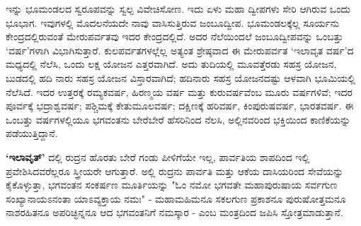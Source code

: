 ಇನ್ನು ಭೂಮಂಡಲದ ಸ್ವರೂಪವನ್ನು ಸ್ವಲ್ಪ ವಿವೇಚಿಸೋಣ. ಇದು ಏಳು ಮಹಾ ದ್ವೀಪಗಳು ಸೇರಿ ಆಗಿರುವ ಒಂದು ಭೂಭಾಗ. ಇವುಗಳಲ್ಲಿ ಮೊದಲನೆಯದೇ ನಾವು ವಾಸಿಸುತ್ತಿರುವ ಜಂಬೂದ್ವೀಪ. ಭೂಮಂಡಲಕ್ಕೆಲ್ಲ ಸೂರ್ಯನು ಕೇಂದ್ರದಲ್ಲಿರುವಂತೆ ಮೇರುಪರ್ವತವು ಇದರ ಕೇಂದ್ರದಲ್ಲಿದೆ. ಅದರ ನೆಲೆಯಿಂದಲೆ ಜಂಬೂದ್ವೀಪವನ್ನು ಒಂಬತ್ತು ‘ವರ್ಷ’ಗಳಾಗಿ ವಿಭಾಗಿಸುತ್ತಾರೆ. ಕುಲಪರ್ವತಗಳಲ್ಲೆಲ್ಲ ಅತ್ಯಂತ ಶ್ರೇಷ್ಠವಾದ ಈ ಮೇರುಪರ್ವತ ‘ಇಲಾವೃತ ವರ್ಷ’ದ ಮಧ್ಯದಲ್ಲಿ ನೆಲೆಸಿ, ಒಂದು ಲಕ್ಷ ಯೋಜನ ಎತ್ತರವಾಗಿದೆ. ಅದು ತುದಿಯಲ್ಲಿ ಮೂವತ್ತೆರಡು ಸಹಸ್ರ ಯೋಜನ, ಬುಡದಲ್ಲಿ ಹದಿ ನಾರು ಸಹಸ್ರ ಯೋಜನ ವಿಸ್ತಾರವಾಗಿದೆ; ಹದಿನಾರು ಸಹಸ್ರ ಯೋಜನದಷ್ಟು ಆಳವಾಗಿ ಭೂಮಿಯಲ್ಲಿ ನೆಲೆಸಿದೆ. ಇದರ ಉತ್ತರಕ್ಕೆ ರಮ್ಯಕವರ್ಷ, ಹಿರಣ್ಮಯ ವರ್ಷ ಮತ್ತು ಕುರುವರ್ಷವೆಂಬ ಮೂರು ವರ್ಷಗಳಿವೆ; ಇದರ ಪೂರ್ವಕ್ಕೆ ಭದ್ರಾಶ್ವವರ್ಷ; ಪಶ್ಚಿಮಕ್ಕೆ ಕೇತುಮೂಲವರ್ಷ; ದಕ್ಷಿಣಕ್ಕೆ ಹರಿವರ್ಷ, ಕಿಂಪುರುಷವರ್ಷ, ಭಾರತವರ್ಷ. ಈ ಒಂಬತ್ತು ವರ್ಷಗಳಲ್ಲಿಯೂ ಭಗವಂತನು ಬೇರೆಬೇರೆ ಹೆಸರಿನಿಂದ ನೆಲಸಿ, ಅಲ್ಲಿನವರಿಂದ ಭಕ್ತಿಯಿಂದ ಕಾಣಿಕೆಯನ್ನು ಪಡೆಯುತ್ತಿದ್ದಾನೆ.

\textbf{‘ಇಲಾವೃತ್’} ದಲ್ಲಿ ರುದ್ರನ ಹೊರತು ಬೇರೆ ಗಂಡು ಪೀಳಿಗೆಯೇ ಇಲ್ಲ, ಪಾರ್ವತಿಯ ಶಾಪದಿಂದ ಇಲ್ಲಿ ಪ್ರವೇಶಿಸಿದವರೆಲ್ಲರೂ ಸ್ತ್ರೀಯರೇ ಆಗುತ್ತಾರೆ. ಅಲ್ಲಿ ರುದ್ರನು ಪಾರ್ವತಿ ಮತ್ತು ಆಕೆಯ ದಾಸಿಯರಿಂದ ಸೇವೆಯನ್ನು ಕೈಕೊಳ್ಳುತ್ತಾ, ಭಗವಂತನ ಸಂಕರ್ಷಣ ಮೂರ್ತಿಯನ್ನು "ಓಂ ನಮೋ ಭಗವತೇ ಮಹಾಪುರುಷಾಯ ಸರ್ವಗುಣ ಸಂಖ್ಯಾನಾಯಽನಂತಾ ಯಾಽವ್ಯಕ್ತಾಯ ನಮಃ" - ಮಹಾಮಹಿಮನೂ ಸಕಲಗುಣ ಪ್ರಕಾಶನೂ ಪುರುಷೋತ್ತಮನೂ ನಾಶರಹಿತನೂ ಅಪರಿಚ್ಛಿನ್ನನೂ ಆದ ಭಗವಂತನಿಗೆ ನಮಸ್ಕಾರ - ಎಂಬ ಮಂತ್ರದಿಂದ ಜಪಿಸಿ ಸ್ತೋತ್ರಮಾಡುತ್ತಾನೆ.

